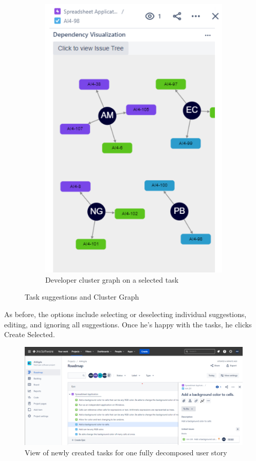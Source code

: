 \begin{figure}
\begin{subfigure}{.5\textwidth}
\includegraphics[width=.8\linewidth,keepaspectratio]{./figure/Scenario2Figure2.png}
\caption{Developer cluster graph on a selected task}
\label{fig:Scenario2Figure2}
\end{subfigure}
\caption{Task suggestions and Cluster Graph}
\end{figure}

As before, the options include selecting or deselecting individual suggestions, editing, and ignoring all suggestions. Once he’s happy with the tasks, he clicks Create Selected.

\begin{figure}
\centering
\includegraphics[width=\textwidth,keepaspectratio]{./figure/Scenario1Figure5.png}
\caption{View of newly created tasks for one fully decomposed user story}
\label{fig:Scenario1Figure5}
\end{figure}

